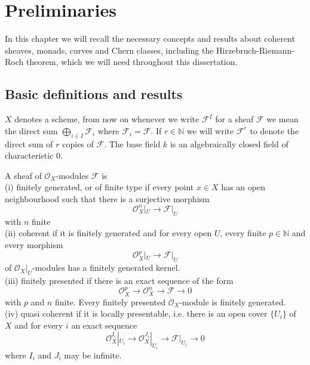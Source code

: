 \documentclass[
	oldfontcommands,
	sumario=abnt-6027-2012,
	12pt,			%
	openright,		%
	oneside,		%
	a4paper,		%
	english,		%
	brazil			%
	]{imecc-unicamp}
\begin{document}
\chapter{Preliminaries}
In this chapter we will recall the necessary concepts and results about coherent sheaves, monads, curves and Chern classes, including the Hirzebruch-Riemann-Roch theorem, which we will need throughout this dissertation.
\section{Basic definitions and results}
$X$ denotes a scheme, from now on whenever we write $\mathcal{F}^I$ for a sheaf $\mathcal{F}$ we mean the direct sum $\bigoplus_{i \in I} \mathcal{F}_i$ where $\mathcal{F}_i=\mathcal{F}$. If $r \in \mathbb{N}$ we will write $\mathcal{F}^r$ to denote the direct sum of $r$ copies of $\mathcal{F}$.
The base field $k$ is an algebraically closed field of characteristic 0.
\begin{definition}
A sheaf of $\mathcal{O}_X$-modules $\mathcal{F}$ is \\
(i) finitely generated, or of finite type if every point $x \in X$ has an open neighbourhood such that there is a surjective morphism
\begin{equation}
\mathcal{O}_X^n|_U \to \mathcal{F}|_U
\end{equation}
with $n$ finite \\
(ii) coherent if it is finitely generated and for every open $U$, every finite $p \in \mathbb{N}$ and every morphism 
\begin{equation}
\mathcal{O}_X^p|_U \to \mathcal{F}|_U
\end{equation}
of $\mathcal{O}_X|_U$-modules has a finitely generated kernel. \\
(iii) finitely presented if there is an exact sequence of the form
\begin{equation}
\mathcal{O}_X^p \to \mathcal{O}_X^n \to \mathcal{F} \to 0
\end{equation}
with $p$ and $n$ finite. Every finitely presented $\mathcal{O}_X$-module is finitely generated. \\
(iv) quasi coherent if it is locally presentable, i.e. there is an open cover $\{U_i \}$ of $X$ and for every $i$ an exact sequence
\begin{equation}
\mathcal{O}_X^{I_i}|_{U_i} \to \mathcal{O}_X^{J_i}|_{U_i} \to \mathcal{F}|_{U_i} \to 0
\end{equation}
where $I_i$ and $J_i$ may be infinite.
\end{definition}
\end{document}
